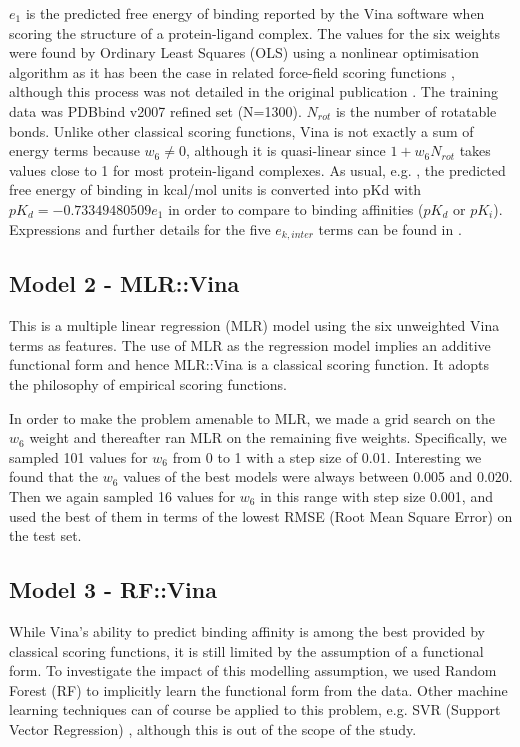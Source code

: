 $e_1$ is the predicted free energy of binding reported by the Vina software when scoring the structure of a protein-ligand complex. The values for the six weights were found by Ordinary Least Squares (OLS) using a nonlinear optimisation algorithm as it has been the case in related force-field scoring functions \citep{1454}, although this process was not detailed in the original publication \citep{595}. The training data was PDBbind v2007 refined set (N=1300). $N_{rot}$ is the number of rotatable bonds. Unlike other classical scoring functions, Vina is not exactly a sum of energy terms because $w_6\neq0$, although it is quasi-linear since $1+w_6N_{rot}$ takes values close to 1 for most protein-ligand complexes. As usual, e.g. \citep{1362}, the predicted free energy of binding in kcal/mol units is converted into pKd with $pK_d=-0.73349480509e_1$ in order to compare to binding affinities ($pK_d$ or $pK_i$). Expressions and further details for the five $e_{k, inter}$ terms can be found in \citep{595,1362}.

\subsection{Model 2 - MLR::Vina}

This is a multiple linear regression (MLR) model using the six unweighted Vina terms as features. The use of MLR as the regression model implies an additive functional form and hence MLR::Vina is a classical scoring function. It adopts the philosophy of empirical scoring functions.

In order to make the problem amenable to MLR, we made a grid search on the $w_6$ weight and thereafter ran MLR on the remaining five weights. Specifically, we sampled 101 values for $w_6$ from 0 to 1 with a step size of 0.01. Interesting we found that the $w_6$ values of the best models were always between 0.005 and 0.020. Then we again sampled 16 values for $w_6$ in this range with step size 0.001, and used the best of them in terms of the lowest RMSE (Root Mean Square Error) on the test set.

\subsection{Model 3 - RF::Vina}

While Vina's ability to predict binding affinity is among the best provided by classical scoring functions, it is still limited by the assumption of a functional form. To investigate the impact of this modelling assumption, we used Random Forest (RF) \citep{1309} to implicitly learn the functional form from the data. Other machine learning techniques can of course be applied to this problem, e.g. SVR (Support Vector Regression) \citep{1295}, although this is out of the scope of the study.

